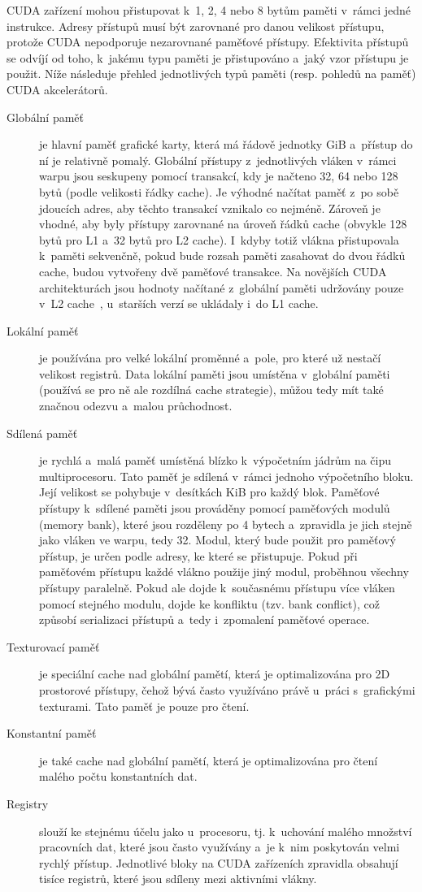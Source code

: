 CUDA zařízení mohou přistupovat k~1, 2, 4 nebo 8 bytům paměti v~rámci jedné instrukce. Adresy přístupů musí být zarovnané pro danou velikost přístupu, protože CUDA nepodporuje nezarovnané paměťové přístupy. Efektivita přístupů se odvíjí od toho, k~jakému typu paměti je přistupováno a~jaký vzor přístupu je použit. Níže následuje přehled jednotlivých typů paměti (resp. pohledů na paměť) CUDA akcelerátorů.
\begin{description}
    \item[Globální paměť] je hlavní paměť grafické karty, která má řádově jednotky GiB a~přístup do ní je relativně pomalý. Globální přístupy z~jednotlivých vláken v~rámci warpu jsou seskupeny pomocí transakcí, kdy je načteno 32, 64 nebo 128 bytů (podle velikosti řádky cache). Je výhodné načítat paměť z~po sobě jdoucích adres, aby těchto transakcí vznikalo co nejméně. Zároveň je vhodné, aby byly přístupy zarovnané na úroveň řádků cache (obvykle 128 bytů pro L1 a~32 bytů pro L2 cache). I~kdyby totiž vlákna přistupovala k~paměti sekvenčně, pokud bude rozsah paměti zasahovat do dvou řádků cache, budou vytvořeny dvě paměťové transakce. Na novějších CUDA architekturách jsou hodnoty načítané z~globální paměti udržovány pouze v~L2 cache~\cite{cudacguide}, u~starších verzí se ukládaly i~do L1 cache.
    \item[Lokální paměť] je používána pro velké lokální proměnné a~pole, pro které už nestačí velikost registrů. Data lokální paměti jsou umístěna v~globální paměti (používá se pro ně ale rozdílná cache strategie), můžou tedy mít také značnou odezvu a~malou průchodnost.
    \item[Sdílená paměť] je rychlá a~malá paměť umístěná blízko k~výpočetním jádrům na čipu multiprocesoru. Tato paměť je sdílená v~rámci jednoho výpočetního bloku. Její velikost se pohybuje v~desítkách KiB pro každý blok. Paměťové přístupy k~sdílené paměti jsou prováděny pomocí paměťových modulů (memory bank), které jsou rozděleny po 4 bytech a~zpravidla je jich stejně jako vláken ve warpu, tedy 32. Modul, který bude použit pro paměťový přístup, je určen podle adresy, ke které se přistupuje. Pokud při paměťovém přístupu každé vlákno použije jiný modul, proběhnou všechny přístupy paralelně. Pokud ale dojde k~současnému přístupu více vláken pomocí stejného modulu, dojde ke konfliktu (tzv. bank conflict), což způsobí serializaci přístupů a~tedy i~zpomalení paměťové operace.
    \item[Texturovací paměť] je speciální cache nad globální pamětí, která je optimalizována pro 2D prostorové přístupy, čehož bývá často využíváno právě u~práci s~grafickými texturami. Tato paměť je pouze pro čtení.
    \item[Konstantní paměť] je také cache nad globální pamětí, která je optimalizována pro čtení malého počtu konstantních dat.
    \item[Registry] slouží ke stejnému účelu jako u~procesoru, tj. k~uchování malého množství pracovních dat, které jsou často využívány a~je k~nim poskytován velmi rychlý přístup. Jednotlivé bloky na CUDA zařízeních zpravidla obsahují tisíce registrů, které jsou sdíleny mezi aktivními vlákny.
\end{description}

